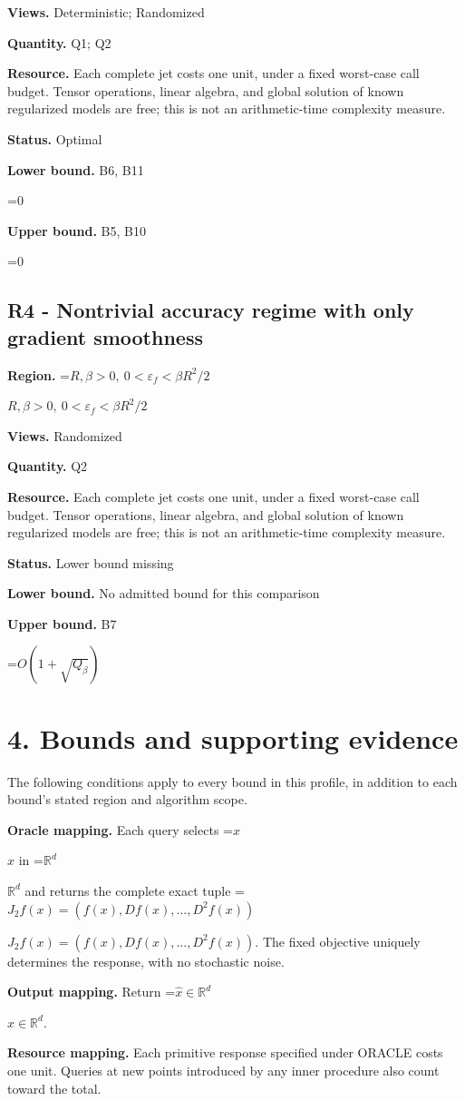 \documentclass[10pt,a4paper]{article}
\newcommand{\AtlasMath}[1]{\par\begingroup\centering\setbox0=\hbox{$\displaystyle #1$}\ifdim\wd0>1.4\linewidth\typeout{ATLAS WIDE FORMULA: \the\wd0}\fi\ifdim\wd0>\linewidth\resizebox{\linewidth}{!}{\box0}\else\box0\fi\par\endgroup}
\newcommand{\AtlasInlineMath}[1]{\begingroup\setbox0=\hbox{$#1$}\ifdim\wd0>.4\linewidth\endgroup\AtlasMath{#1}\else\endgroup$#1$\fi}
\begin{document}
\textbf{Views.} Deterministic; Randomized

\textbf{Quantity.} Q1; Q2

\textbf{Resource.} Each complete jet costs one unit, under a fixed worst-case call budget. Tensor operations, linear algebra, and global solution of known regularized models are free; this is not an arithmetic-time complexity measure.

\textbf{Status.} Optimal

\textbf{Lower bound.} B6, B11

\AtlasMath{0}
\textbf{Upper bound.} B5, B10

\AtlasMath{0}
\subsection{R4 - Nontrivial accuracy regime with only gradient smoothness}
\textbf{Region.} \AtlasInlineMath{R,\beta>0,\ 0<\varepsilon_f<\beta R^2/2}

\textbf{Views.} Randomized

\textbf{Quantity.} Q2

\textbf{Resource.} Each complete jet costs one unit, under a fixed worst-case call budget. Tensor operations, linear algebra, and global solution of known regularized models are free; this is not an arithmetic-time complexity measure.

\textbf{Status.} Lower bound missing

\textbf{Lower bound.} No admitted bound for this comparison

\textbf{Upper bound.} B7

\AtlasMath{O(1+\sqrt{Q_\beta})}
\section{4. Bounds and supporting evidence}
The following conditions apply to every bound in this profile, in addition to each bound's stated region and algorithm scope.

\textbf{Oracle mapping.} Each query selects \AtlasInlineMath{x} in \AtlasInlineMath{\mathbb{R}^d} and returns the complete exact tuple \AtlasInlineMath{J_{2}f(x)=(f(x),Df(x),\ldots,D^{2}f(x))}. The fixed objective uniquely determines the response, with no stochastic noise.

\textbf{Output mapping.} Return \AtlasInlineMath{\widehat{x}\in \mathbb{R}^d}.

\textbf{Resource mapping.} Each primitive response specified under ORACLE costs one unit. Queries at new points introduced by any inner procedure also count toward the total.
\end{document}
